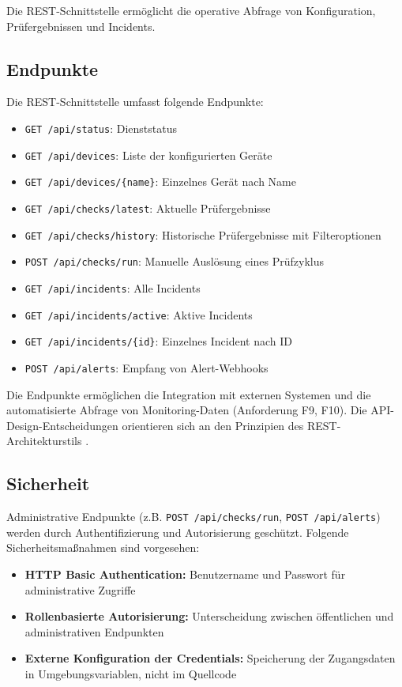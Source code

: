 Die REST-Schnittstelle ermöglicht die operative Abfrage von Konfiguration, Prüfergebnissen und Incidents.

\subsection{Endpunkte}
\label{subsec:endpunkte}

Die REST-Schnittstelle umfasst folgende Endpunkte:

\begin{itemize}
    \item \texttt{GET /api/status}: Dienststatus
    \item \texttt{GET /api/devices}: Liste der konfigurierten Geräte
    \item \texttt{GET /api/devices/\{name\}}: Einzelnes Gerät nach Name
    \item \texttt{GET /api/checks/latest}: Aktuelle Prüfergebnisse
    \item \texttt{GET /api/checks/history}: Historische Prüfergebnisse mit Filteroptionen
    \item \texttt{POST /api/checks/run}: Manuelle Auslösung eines Prüfzyklus
    \item \texttt{GET /api/incidents}: Alle Incidents
    \item \texttt{GET /api/incidents/active}: Aktive Incidents
    \item \texttt{GET /api/incidents/\{id\}}: Einzelnes Incident nach ID
    \item \texttt{POST /api/alerts}: Empfang von Alert-Webhooks
\end{itemize}

Die Endpunkte ermöglichen die Integration mit externen Systemen und die automatisierte Abfrage von Monitoring-Daten (Anforderung F9, F10). Die API-Design-Entscheidungen orientieren sich an den Prinzipien des REST-Architekturstils \cite{rest-architectural-style}.

\subsection{Sicherheit}
\label{subsec:sicherheit-rest}

Administrative Endpunkte (z.B. \texttt{POST /api/checks/run}, \texttt{POST /api/alerts}) werden durch Authentifizierung und Autorisierung geschützt. Folgende Sicherheitsmaßnahmen sind vorgesehen:

\begin{itemize}
    \item \textbf{HTTP Basic Authentication:} Benutzername und Passwort für administrative Zugriffe
    \item \textbf{Rollenbasierte Autorisierung:} Unterscheidung zwischen öffentlichen und administrativen Endpunkten
    \item \textbf{Externe Konfiguration der Credentials:} Speicherung der Zugangsdaten in Umgebungsvariablen, nicht im Quellcode
\end{itemize}

